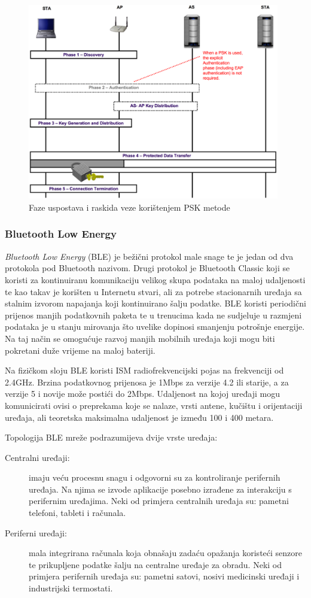 \documentclass[times, utf8, diplomski]{fer}
\begin{document}
\begin{figure}[H]
    \centering
    \includegraphics[width=11cm]{images/psk.png}
    \caption{Faze uspostava i raskida veze korištenjem PSK metode\citep{NIST}}
    \label{fig:psk}
\end{figure}

\subsubsection{Bluetooth Low Energy}
\emph{Bluetooth Low Energy} (BLE) je bežični protokol male snage te je jedan od dva protokola pod Bluetooth nazivom. Drugi protokol je Bluetooth Classic koji se koristi za kontinuiranu komunikaciju velikog skupa podataka na maloj udaljenosti te kao takav je korišten u Internetu stvari, ali za potrebe stacionarnih uređaja sa stalnim izvorom napajanja koji kontinuirano šalju podatke. BLE koristi periodični prijenos manjih podatkovnih paketa te u trenucima kada ne sudjeluje u razmjeni podataka je u stanju mirovanja što uvelike dopinosi smanjenju potrošnje energije. Na taj način se omogućuje razvoj manjih mobilnih uređaja koji mogu biti pokretani duže vrijeme na maloj bateriji. 

Na fizičkom sloju BLE koristi ISM  radiofrekvencijski pojas na frekvenciji od 2.4GHz. Brzina podatkovnog prijenosa je 1Mbps za verzije 4.2 ili starije, a za verzije 5 i novije može postići do 2Mbps. Udaljenost na kojoj uređaji mogu komunicirati ovisi o preprekama koje se nalaze, vrsti antene, kučištu i orijentaciji uređaja, ali teoretska maksimalna udaljenost je između 100 i 400 metara.

Topologija BLE mreže podrazumijeva dvije vrste uređaja:
\begin{description}
    \item[Centralni uređaji:]imaju veću procesnu snagu i odgovorni su za kontroliranje perifernih uređaja. Na njima se izvode aplikacije posebno izrađene za interakciju s perifernim uređajima. Neki od primjera centralnih uređaja su: pametni telefoni, tableti i računala. 
    \item[Periferni uređaji:]mala integrirana računala koja obnašaju zadaću opažanja koristeći senzore te prikupljene podatke šalju na centralne uređaje za obradu. Neki od primjera perifernih uređaja su: pametni satovi, nosivi medicinski uređaji i industrijski termostati.
\end{description}
\end{document}
